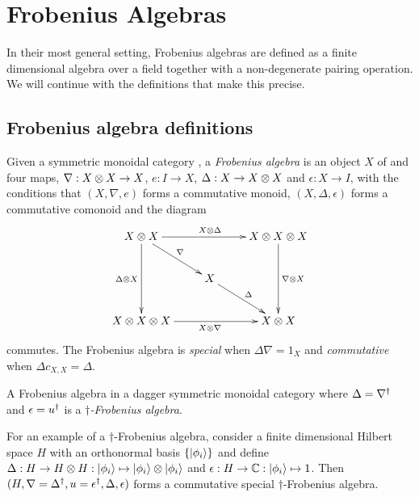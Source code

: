 \section{Frobenius Algebras} %
\label{sec:frobenius_algebras}
In their most general setting, Frobenius algebras are defined as a finite dimensional algebra
over a field together with a non-degenerate pairing operation. We will continue with the definitions
that make this precise.

\subsection{Frobenius algebra definitions} %
\label{sub:frobenius_algebra_definitions}


\begin{definition}\label{def:frobeniusalgebra}
  Given a symmetric monoidal category \cD, a \emph{Frobenius algebra} is an object $X$ of \cD and
  four maps, $\nabla :X\otimes X \to X$, $e: I \to X$, $\Delta: X\to X\otimes X$ and $\epsilon:X\to I$, with
  the conditions that $(X,\nabla,e)$ forms a commutative monoid, $(X,\Delta, \epsilon)$ forms a
  commutative comonoid and the diagram
  \[
    \xymatrix{
      X\*X \ar[rr]^{X\*\Delta} \ar[dd]_{\Delta \* X} \ar[dr]^{\nabla}
        && X\*X\*X \ar[dd]^{\nabla\*X}\\
      & X\ar[dr]^{\Delta}\\
      X\*X\*X\ar[rr]_{X\*\nabla}  && X\*X
    }
  \]
  commutes. The Frobenius algebra is \emph{special} when $\Delta \nabla = 1_{X}$ and
  \emph{commutative} when $\Delta c_{X,X} = \Delta$.
\end{definition}
\begin{definition}\label{def:daggerfrob}
  A Frobenius algebra in a dagger symmetric monoidal category where $\Delta = {\nabla}^{\dagger}$ and
  $\epsilon={u}^{\dagger}$ is a $\dagger$\emph{-Frobenius algebra}.
\end{definition}
For an example of a $\dagger$-Frobenius algebra, consider a finite dimensional Hilbert space $H$
with an orthonormal basis $\{\left\vert{\phi_{i}}\right\rangle\}$ and define $\Delta:H\to H\otimes H: \left\vert{\phi_{i}}\right\rangle\mapsto
\left\vert{\phi_{i}}\right\rangle \otimes \left\vert{\phi_{i}}\right\rangle$ and $\epsilon : H\to \mathbb{C} : \left\vert{\phi_{i}}\right\rangle \mapsto 1$. Then $(H,
\nabla={\Delta}^{\dagger}, u={\epsilon}^{\dagger}, \Delta, \epsilon)$ forms a commutative special
$\dagger$-Frobenius algebra.


